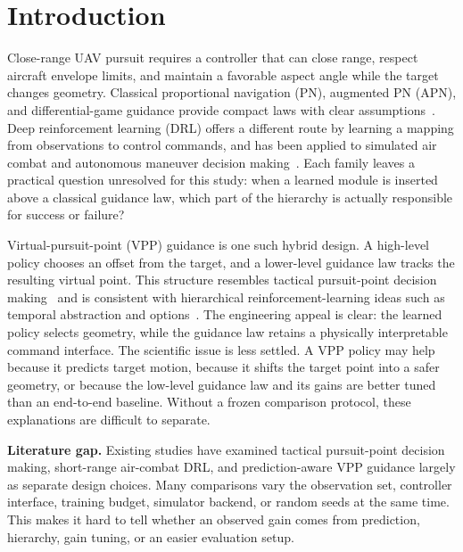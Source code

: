 \section{Introduction}\label{sec:introduction}

Close-range UAV pursuit requires a controller that can close range, respect aircraft envelope limits, and maintain a favorable aspect angle while the target changes geometry. Classical proportional navigation (PN), augmented PN (APN), and differential-game guidance provide compact laws with clear assumptions~\cite{pn,zarchan2012,apn1971,shima2002}. Deep reinforcement learning (DRL) offers a different route by learning a mapping from observations to control commands, and has been applied to simulated air combat and autonomous maneuver decision making~\cite{ppo,sb3,ernest2016,mn2019,hu2021bvr,li2022msddqn,fan2022a3c,yang2024drl,chai2023tsmc,wang2024kbs,zheng2024sci}. Each family leaves a practical question unresolved for this study: when a learned module is inserted above a classical guidance law, which part of the hierarchy is actually responsible for success or failure?

Virtual-pursuit-point (VPP) guidance is one such hybrid design. A high-level policy chooses an offset from the target, and a lower-level guidance law tracks the resulting virtual point. This structure resembles tactical pursuit-point decision making~\cite{mpn2022} and is consistent with hierarchical reinforcement-learning ideas such as temporal abstraction and options~\cite{barto2003hrl,kulkarni2016hdqn,bacon2017option,sutton1999options}. The engineering appeal is clear: the learned policy selects geometry, while the guidance law retains a physically interpretable command interface. The scientific issue is less settled. A VPP policy may help because it predicts target motion, because it shifts the target point into a safer geometry, or because the low-level guidance law and its gains are better tuned than an end-to-end baseline. Without a frozen comparison protocol, these explanations are difficult to separate.

\textbf{Literature gap.} Existing studies have examined tactical pursuit-point decision making, short-range air-combat DRL, and prediction-aware VPP guidance largely as separate design choices. Many comparisons vary the observation set, controller interface, training budget, simulator backend, or random seeds at the same time. This makes it hard to tell whether an observed gain comes from prediction, hierarchy, gain tuning, or an easier evaluation setup.

